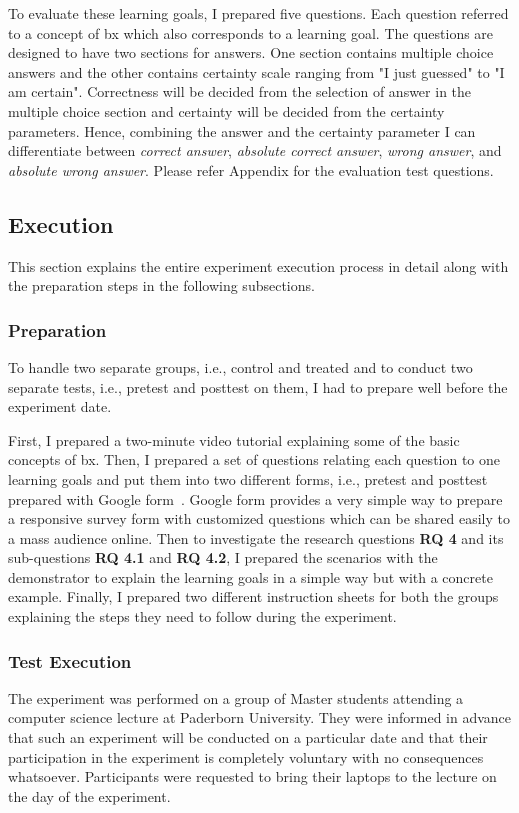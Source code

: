 To evaluate these learning goals, I prepared five questions. Each question referred to a concept of bx which also corresponds to a learning goal. The questions are designed to have two sections for answers. One section contains multiple choice answers and the other contains certainty scale ranging from "I just guessed" to "I am certain". Correctness will be decided from the selection of answer in the multiple choice section and certainty will be decided from the certainty parameters. Hence, combining the answer and the certainty parameter I can differentiate between \emph{correct answer}, \emph{absolute correct answer}, \emph{wrong answer}, and \emph{absolute wrong answer}. Please refer Appendix for the evaluation test questions.

\subsection{Execution}\label{subsec:execution} 
This section explains the entire experiment execution process in detail along with the preparation steps in the following subsections.

\subsubsection{Preparation }\label{subsubsec:prep}
To handle two separate groups, i.e., control and treated and to conduct two separate tests, i.e., pretest and posttest on them, I had to prepare well before the experiment date. 

First, I prepared a two-minute video tutorial explaining some of the basic concepts of bx. Then, I prepared a set of questions relating each question to one learning goals and put them into two different forms, i.e., pretest and posttest prepared with Google form~\cite{google-forms}. Google form provides a very simple way to prepare a responsive survey form with customized questions which can be shared easily to a mass audience online. Then to investigate the research questions \textbf{RQ 4} and its sub-questions \textbf{RQ 4.1} and \textbf{RQ 4.2}, I prepared the scenarios with the demonstrator to explain the learning goals in a simple way but with a concrete example. Finally, I prepared two different instruction sheets for both the groups explaining the steps they need to follow during the experiment.

\subsubsection{Test Execution}\label{subsubsec:execution}
The experiment was performed on a group of Master students attending a computer science lecture at Paderborn University. They were informed in advance that such an experiment will be conducted on a particular date and that their participation in the experiment is completely voluntary with no consequences whatsoever. Participants were requested to bring their laptops to the lecture on the day of the experiment.

